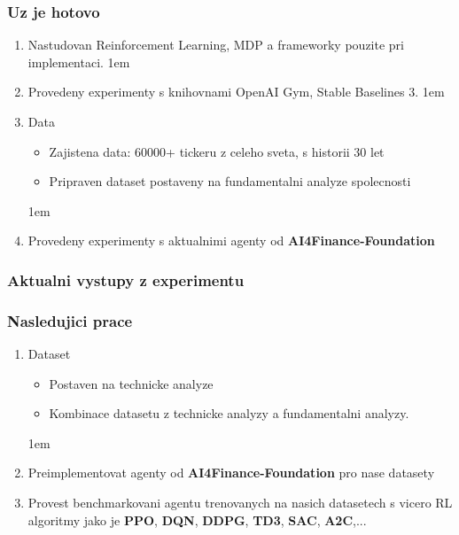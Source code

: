 \begin{frame}
    \frametitle{Uz je hotovo}
    \begin{enumerate}
        \itemsep1em
        \item Nastudovan Reinforcement Learning, MDP a frameworky pouzite pri implementaci.
        \itemsep1em
        \item Provedeny experimenty s knihovnami OpenAI Gym, Stable Baselines 3.
        \itemsep1em
        \item Data
        \begin{itemize}
            \item Zajistena data: 60000+ tickeru z celeho sveta, s historii 30 let
            \item Pripraven dataset postaveny na fundamentalni analyze spolecnosti
        \end{itemize}
        \itemsep1em
        \item Provedeny experimenty s aktualnimi agenty od \textbf{AI4Finance-Foundation}
    \end{enumerate}
\end{frame}

\begin{frame}
    \frametitle{Aktualni vystupy z experimentu}
\end{frame}

\begin{frame}
    \frametitle{Nasledujici prace}
    \begin{enumerate}
        \item Dataset
        \begin{itemize}
            \item Postaven na technicke analyze
            \item Kombinace datasetu z technicke analyzy a fundamentalni analyzy.
        \end{itemize}
        \itemsep1em
        \item Preimplementovat agenty od \textbf{AI4Finance-Foundation} pro nase datasety
        \item Provest benchmarkovani agentu trenovanych na nasich datasetech s vicero RL algoritmy jako je
        \textbf{PPO}, \textbf{DQN}, \textbf{DDPG}, \textbf{TD3}, \textbf{SAC}, \textbf{A2C},...
    \end{enumerate}
\end{frame}

